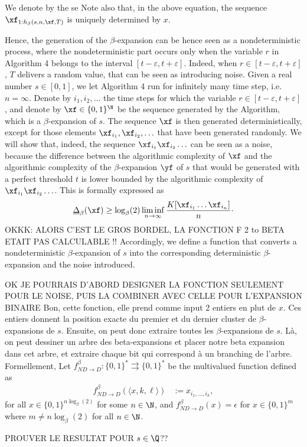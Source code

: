 We denote by  the se
Note also that, in the above equation, the sequence $\xf_{1:h_\beta(s,n,\xf,T)}$ is uniquely determined by $x$.



Hence, the generation of the $\beta$-expansion can be hence seen as a nondeterministic process, where the nondeterministic part occurs only when the variable $r$ in Algorithm 4 belongs to the interval $[t - \varepsilon, t + \varepsilon]$. Indeed, when $r \in [t - \varepsilon, t + \varepsilon]$, $T$ delivers a random value, that can be seen as introducing noise. Given a real number $s \in [0,1]$, we let Algorithm 4 run for infinitely many time step, i.e. $n = \infty$. Denote by $i_1, i_2, \ldots $ the time steps for which the variable $r \in [t - \varepsilon, t + \varepsilon]$, and denote by $\xf \in \{0,1\}^\N$ be the sequence generated by the Algorithm, which is a $\beta$-expansion of $s$. The sequence $\xf$ is then generated deterministically, except for those elements $\xf_{i_1}, \xf_{i_2}, \ldots$ that have been generated randomly. We will show that, indeed, the sequence $\xf_{i_1}\xf_{i_2}\ldots $ can be seen as a noise, because the difference between the algorithmic complexity of $\xf$ and the algorithmic complexity of the $\beta$-expansion $\yf$ of $s$ that would be generated with a perfect threshold $t$ is lower bounded by the algorithmic complexity of $\xf_{i_1}\xf_{i_2}\ldots$. This is formally expressed as 
\begin{equation}
    \underline{\Delta}_\beta(\xf) \geq \log_\beta(2) \liminf_{n \to \infty} \frac{K[\xf_{i_1} \ldots \xf_{i_n}]}{n}\cdot
\end{equation}
OKKK: ALORS C'EST LE GROS BORDEL, LA FONCTION F 2 to BETA ETAIT PAS CALCULABLE !!
Accordingly, we define a function that converts a nondeterministic $\beta$-expansion of $s$ into the corresponding deterministic $\beta$-expansion and the noise introduced.
\begin{definition}\label{def:multivalued function converting from nondeterministic beta to deterministic beta + noise}
    OK JE POURRAIS D'ABORD DESIGNER LA FONCTION SEULEMENT POUR LE NOISE, PUIS LA COMBINER AVEC CELLE POUR L'EXPANSION BINAIRE
    Bon, cette fonction, elle prend comme input 2 entiers en plut de $x$. Ces entiers donnent la position exacte du premier et du dernier cluster de $\beta$-expansions de $s$. Ensuite, on peut donc extraire toutes les $\beta$-expansions de $s$. Là, on peut dessiner un arbre des beta-expansions et placer notre beta expansion dans cet arbre, et extraire chaque bit qui correspond à un branching de l'arbre. Formellement,
    Let $f^\beta_{ND\to D} : \{0,1\}^\ast \rightrightarrows \{0,1\}^\ast$ be the multivalued function defined as 
\begin{align}\label{eq:main:def:multivalued function converting from base beta to base 2 + noise}
    f^\beta_{ND\to D}(\langle x, k, \ell \rangle) &:= x_{i_1, \ldots, i_h},
\end{align}
for all $x \in \{0,1\}^{n\log_\beta(2)}$ for some $n \in \N$, and $f^\beta_{ND\to D}(x) = \epsilon$ for $x \in \{0,1\}^m$ where $m \neq n \log_\beta(2)$ for all $n \in \N$.
\end{definition} 
PROUVER LE RESULTAT POUR $s \in \Q$??




